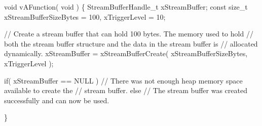 \begin{DoxyPre}void vAFunction( void )
\{
StreamBufferHandle\_t xStreamBuffer;
const size\_t xStreamBufferSizeBytes = 100, xTriggerLevel = 10;
\begin{DoxyVerb}// Create a stream buffer that can hold 100 bytes.  The memory used to hold
// both the stream buffer structure and the data in the stream buffer is
// allocated dynamically.
xStreamBuffer = xStreamBufferCreate( xStreamBufferSizeBytes, xTriggerLevel );

if( xStreamBuffer == NULL )
{
    // There was not enough heap memory space available to create the
    // stream buffer.
}
else
{
    // The stream buffer was created successfully and can now be used.
}
\end{DoxyVerb}

\}
\end{DoxyPre}
 